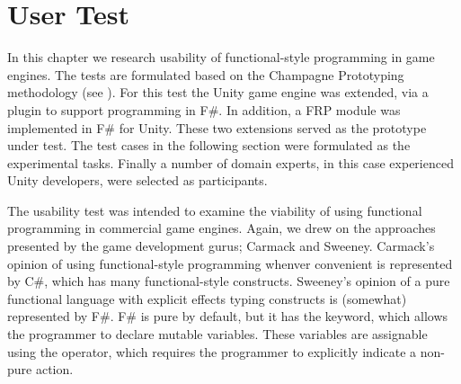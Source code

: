 \chapter{User Test}
In this chapter we research usability of functional-style programming in game engines. The tests are formulated based on the Champagne Prototyping methodology (see ). For this test the Unity game engine was extended, via a plugin to support programming in F\#\cite{fsharp2019plugin}. In addition, a \gls{FRP} module was implemented in F\# for Unity. These two extensions served as the prototype under test. The test cases in the following section were formulated as the experimental tasks. Finally a number of domain experts, in this case experienced Unity developers, were selected as participants.

The usability test was intended to examine the viability of using functional programming in commercial game engines. Again, we drew on the approaches presented by the game development gurus; Carmack and Sweeney. Carmack's opinion of using functional-style programming whenver convenient is represented by C\#, which has many functional-style constructs. Sweeney's opinion of a pure functional language with explicit effects typing constructs is (somewhat) represented by F\#. F\# is pure by default, but it has the  keyword, which allows the programmer to declare mutable variables. These variables are assignable using the \ttt{\textless-} operator, which requires the programmer to explicitly indicate a non-pure action.




